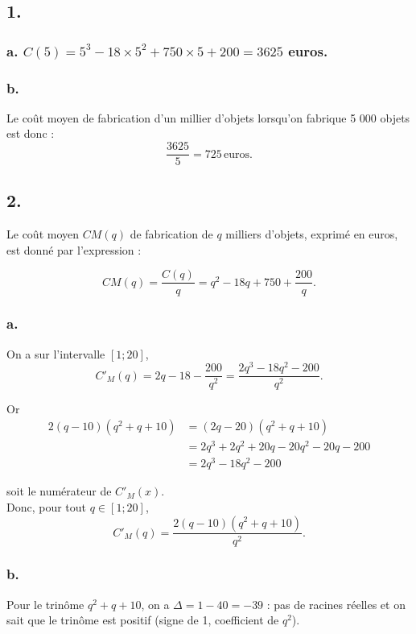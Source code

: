 \subsection*{1.}
	
	\subsubsection*{a.	$C(5) = 5^3 - 18 \times 5^2 + 750 \times 5 + 200 = 3625 $ euros.}
	
	\subsubsection*{b.}
	Le coût moyen de fabrication d’un millier d’objets lorsqu’on fabrique 5 000 objets est donc :
	\[
	\dfrac{3625}{5} = 725 \, \text{euros}.
	\]
	
	\subsection*{2.}
	
	Le coût moyen \(CM(q)\) de fabrication de \(q\) milliers d’objets, exprimé en euros, est donné par l’expression :
	
	\[
	CM(q) = \dfrac{C(q)}{q} = q^2 - 18q + 750 + \dfrac{200}{q}.
	\]
	
	\subsubsection*{a.}
		On a sur l’intervalle \([1 ; 20]\),
	\[
	C'_M(q) = 2q - 18 - \dfrac{200}{q^2} = \dfrac{2q^3 - 18q^2 - 200}{q^2}.
	\]
	
	Or
\begin{align*}
	2(q - 10)(q^2 + q + 10) &= (2q - 20)(q^2 + q + 10)\\
	& = 2q^3 + 2q^2 + 20q - 20q^2 - 20q - 200 \\
	&= 2q^3 - 18q^2 - 200
\end{align*}

	
	
	soit le numérateur de \(C'_M(x)\). \\
	Donc, pour tout \(q \in [1 ; 20]\),
	\[
	C'_M(q) = \dfrac{2(q - 10)(q^2 + q + 10)}{q^2}.
	\]
	
	\subsubsection*{b.}
	

	Pour le trinôme \(q^2 + q + 10\), on a \(\Delta = 1 - 40 = -39\) : pas de racines réelles et on sait que le trinôme est positif (signe de 1, coefficient de \(q^2\)).
	
